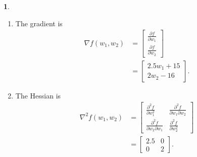 \documentclass[10pt]{article}
\newtheorem{prob}{\bm{$Problem$}}
\begin{document}
\begin{prob}
\end{prob}
\begin{enumerate}[1)]
\vspace{3mm}

\item
The gradient is
\begin{align}
\nabla f(w_1,w_2)&=
  \begin{bmatrix}
    \frac{\partial f}{\partial w_1}\\
    \frac{\partial f}{\partial w_2}
  \end{bmatrix}\\
&=
  \begin{bmatrix}
    2.5w_1+15\\
    2w_2-16
  \end{bmatrix}.
\end{align}
\vspace{3mm}

\item
The Hessian is
\begin{align}
\nabla^2f(w_1,w_2)&=
  \begin{bmatrix}
    \frac{\partial^2 f}{\partial w_1^2} & \frac{\partial ^2 f}{\partial w_1\partial w_2}\\
    \frac{\partial^2 f}{\partial w_2\partial w_1} & \frac{\partial^2 f}{\partial w_2^2}
  \end{bmatrix}\\
&=
  \begin{bmatrix}
    2.5 & 0\\
    0 & 2
  \end{bmatrix}.
\end{align}
\vspace{3mm}


\end{enumerate}
\end{document}
